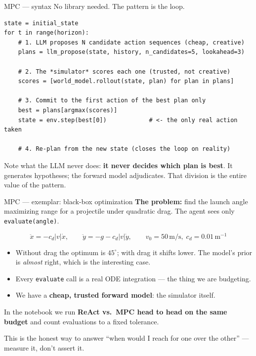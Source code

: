 \documentclass[aspectratio=169,10pt]{beamer}
\newcommand{\code}[1]{\texttt{\small #1}}
\newcommand{\hl}[1]{\textcolor{accent}{\textbf{#1}}}
\begin{document}
\begin{frame}[fragile]{MPC --- syntax}
No library needed. The pattern is the loop.

\begin{lstlisting}
state = initial_state
for t in range(horizon):
    # 1. LLM proposes N candidate action sequences (cheap, creative)
    plans = llm_propose(state, history, n_candidates=5, lookahead=3)

    # 2. The *simulator* scores each one (trusted, not creative)
    scores = [world_model.rollout(state, plan) for plan in plans]

    # 3. Commit to the first action of the best plan only
    best = plans[argmax(scores)]
    state = env.step(best[0])            # <- the only real action taken

    # 4. Re-plan from the new state (closes the loop on reality)
\end{lstlisting}

\vspace{0.5em}
Note what the LLM never does: \hl{it never decides which plan is best}.
It generates hypotheses; the forward model adjudicates. That division is the
entire value of the pattern.
\end{frame}

\begin{frame}{MPC --- exemplar: black-box optimization}
\textbf{The problem:} find the launch angle maximizing range for a projectile
under quadratic drag. The agent sees only \code{evaluate(angle)}.

\vspace{0.6em}
$$\ddot{x} = -c_d|v|\dot{x}, \qquad \ddot{y} = -g - c_d|v|\dot{y},
\qquad v_0 = 50\,\text{m/s},\; c_d = 0.01\,\text{m}^{-1}$$

\vspace{0.6em}
\begin{itemize}\itemsep4pt
  \item Without drag the optimum is $45^\circ$; with drag it shifts lower.
        The model's prior is \emph{almost} right, which is the interesting case.
  \item Every \code{evaluate} call is a real ODE integration --- the thing we
        are budgeting.
  \item We have a \hl{cheap, trusted forward model}: the simulator itself.
\end{itemize}

\vspace{0.8em}
\begin{center}
In the notebook we run \hl{ReAct vs.\ MPC head to head on the same budget}
and count evaluations to a fixed tolerance.
\end{center}

\vspace{0.4em}
{\small\color{gray}This is the honest way to answer ``when would I reach for
one over the other'' --- measure it, don't assert it.}
\end{frame}
\end{document}
